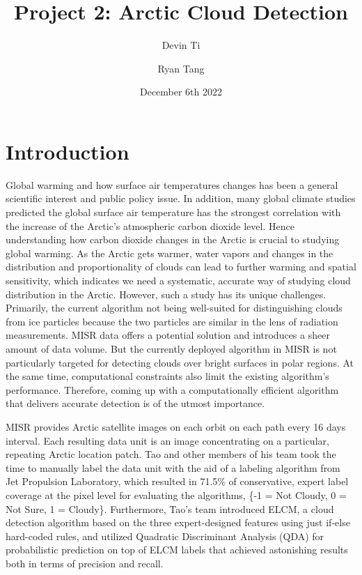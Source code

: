 \documentclass[11pt, letterpaper, journal]{IEEEtran}
\title{Project 2: Arctic Cloud Detection}
\author[1]{Devin Ti}
\author[1]{Ryan Tang}
\affil[1]{Duke University, Statistical Science}
\date{December 6th 2022}
\begin{document}
\maketitle

\section{Introduction}
Global warming and how surface air temperatures changes has been a general scientific interest and public policy issue. In addition, many global climate studies predicted the global surface air temperature has the strongest correlation with the increase of the Arctic's atmospheric carbon dioxide level. Hence understanding how carbon dioxide changes in the Arctic is crucial to studying global warming. As the Arctic gets warmer, water vapors and changes in the distribution and proportionality of clouds can lead to further warming and spatial sensitivity, which indicates we need a systematic, accurate way of studying cloud distribution in the Arctic. However, such a study has its unique challenges. Primarily, the current algorithm not being well-suited for distinguishing clouds from ice particles because the two particles are similar in the lens of radiation measurements. MISR data offers a potential solution and introduces a sheer amount of data volume. But the currently deployed algorithm in MISR is not particularly targeted for detecting clouds over bright surfaces in polar regions. At the same time, computational constraints also limit the existing algorithm's performance. Therefore, coming up with a computationally efficient algorithm that delivers accurate detection is of the utmost importance.

MISR provides Arctic satellite images on each orbit on each path every 16 days interval. Each resulting data unit is an image concentrating on a particular, repeating Arctic location patch. Tao and other members of his team took the time to manually label the data unit with the aid of a labeling algorithm from Jet Propulsion Laboratory, which resulted in 71.5\% of conservative, expert label coverage at the pixel level for evaluating the algorithms, \{-1 = Not Cloudy, 0 = Not Sure, 1 = Cloudy\}. Furthermore, Tao's team introduced ELCM, a cloud detection algorithm based on the three expert-designed features using just if-else hard-coded rules, and utilized Quadratic Discriminant Analysis (QDA) for probabilistic prediction on top of ELCM labels that achieved astonishing results both in terms of precision and recall.
\end{document}
